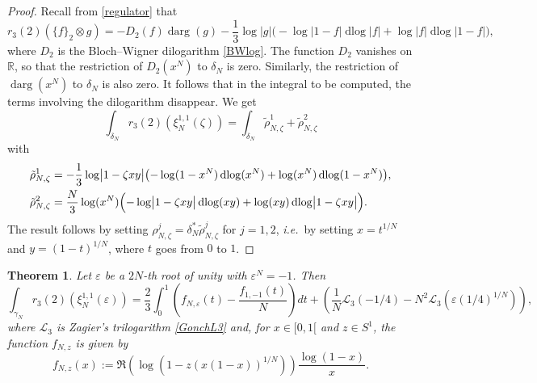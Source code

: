 \documentclass[11pt,a4,leqno]{amsart}
\theoremstyle{my theoremstyle}
\newtheorem{thm}{Theorem}[section]
\theoremstyle{dfn}
\theoremstyle{remark}
\renewcommand{\1}{\mathbbm{1}}
\newcommand{\R}{\mathbb{R}}
\newcommand{\e}{\varepsilon}
\newcommand{\z}{\zeta}
\numberwithin{equation}{section}
\newcommand{\dlog}{\operatorname{dlog}}
\newcommand{\darg}{\operatorname{darg}}
\begin{document}
\begin{proof}
    Recall from \eqref{regulator} that
    \begin{equation*}
        r_3(2)(\{f\}_2 \otimes g) = -D_2(f) \darg(g) - \frac13 \log |g| \bigl(-\log |1-f| \dlog |f| + \log |f| \dlog |1-f| \bigr),
    \end{equation*}
    where $D_2$ is the Bloch--Wigner dilogarithm \eqref{BWlog}.
    The function $D_2$ vanishes on $\R$, so that the restriction of $D_2(x^N)$ to $\delta_N$ is zero. Similarly, the restriction of $\darg(x^N)$ to $\delta_N$ is also zero. It follows that in the integral to be computed, the terms involving the dilogarithm disappear. We get
    \begin{equation}\label{eq1}
        \int_{\delta_N} r_3(2)(\xi_N^{1,1}(\zeta)) = \int_{\delta_N} \tilde\rho_{N,\z}^1 + \tilde\rho_{N,\z}^2
    \end{equation}
    with
    \begin{equation}\label{eq2}
    \begin{split}
        \tilde\rho_{N,\z}^1 & = - \frac13 \log \bigl|1-\zeta xy\bigr| \bigl(-\log(1-x^N) \dlog(x^N) + \log(x^N) \dlog(1-x^N)\bigr), \\
        \tilde\rho_{N,\z}^2 & = \frac{N}{3} \log(x^N) \Bigl(-\log \bigl|1-\zeta xy\bigr| \dlog(xy) + \log(xy) \dlog \bigl|1-\zeta xy\bigr| \Bigr).
    \end{split}
    \end{equation}
    The result follows by setting $\rho_{N,\z}^j=\delta_N^* \tilde\rho_{N,\z}^j$ for $j=1,2$, \emph{i.e.}~by setting $x = t^{1/N}$ and $y = (1-t)^{1/N}$, where $t$ goes from $0$ to $1$.
\end{proof}

\begin{thm}\label{regintN2}
    Let $\e$ be a $2N$-th root of unity with $\e^N=-1$. Then 
    \begin{equation*}
    \int_{\gamma_N} r_3(2)(\xi_{N}^{1,1}(\e))=\frac23  \int_0^1 \left(f_{N, \e}(t) - \frac{f_{1,-1}(t)}{N}\right) dt
      + \left(\frac1N \mathcal{L}_3(-1/4)-N^2 \mathcal{L}_3(\e (1/4)^{1/N})\right),
\end{equation*}
where $\mathcal{L}_3$ is Zagier's trilogarithm \eqref{GonchL3} and, for $x\in [0,1[$ and $z\in S^1$, the function $f_{N, z}$ is given by
\begin{equation*}
    f_{N,z}(x):=\Re(\log(1- z (x(1-x))^{1/N})) \frac{\log(1-x)}{x}.
\end{equation*}
\end{thm}
\end{document}
